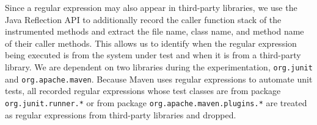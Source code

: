 Since a regular expression may also appear in third-party libraries, we use the Java Reflection API to additionally record the caller function stack of the instrumented methods and extract the file name, class name, and method name of their caller methods. 
This allows us to identify when the regular expression being executed is from the system under test and when it is from a third-party library. 
We are dependent on two libraries during the experimentation, {\tt org.junit} and {\tt org.apache.maven}. 
Because Maven uses regular expressions to automate unit tests, all recorded regular expressions whose test classes are from package \texttt{org.junit.runner.*} or from package \texttt{org.apache.maven.plugins.*} are treated as regular expressions from third-party libraries and dropped.



